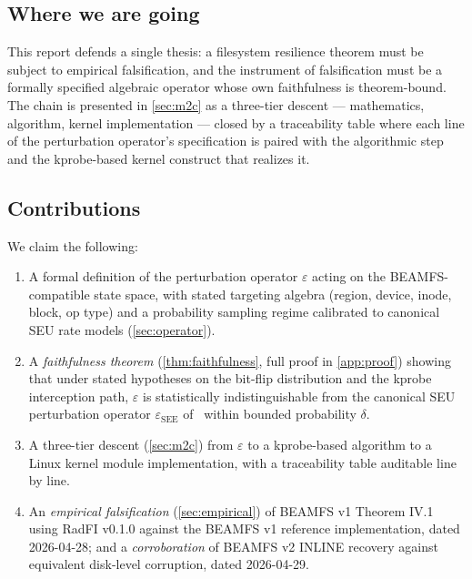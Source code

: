 \subsection{Where we are going}

This report defends a single thesis: a filesystem resilience theorem
must be subject to empirical falsification, and the instrument of
falsification must be a formally specified algebraic operator whose
own faithfulness is theorem-bound. The chain is presented in
\cref{sec:m2c} as a three-tier descent --- mathematics, algorithm,
kernel implementation --- closed by a traceability table where each
line of the perturbation operator's specification is paired with the
algorithmic step and the kprobe-based kernel construct that realizes
it.

\subsection{Contributions}

We claim the following:

\begin{enumerate}
\item A formal definition of the perturbation operator
  \(\varepsilon\) acting on the BEAMFS-compatible state space, with
  stated targeting algebra (region, device, inode, block, op type)
  and a probability sampling regime calibrated to canonical SEU
  rate models (\cref{sec:operator}).
\item A \emph{faithfulness theorem} (\cref{thm:faithfulness}, full
  proof in \cref{app:proof}) showing that under stated hypotheses on
  the bit-flip distribution and the kprobe interception path,
  \(\varepsilon\) is statistically indistinguishable from the
  canonical SEU perturbation operator \(\varepsilon_{\text{SEE}}\)
  of~\cite{desbrieres2026beamfsv1} within bounded probability
  \(\delta\).
\item A three-tier descent (\cref{sec:m2c}) from \(\varepsilon\) to a
  kprobe-based algorithm to a Linux kernel module implementation,
  with a traceability table auditable line by line.
\item An \emph{empirical falsification} (\cref{sec:empirical}) of
  BEAMFS v1 Theorem IV.1~\cite{desbrieres2026beamfsv1} using RadFI
  v0.1.0 against the BEAMFS v1 reference implementation, dated
  2026-04-28; and a \emph{corroboration} of BEAMFS v2 INLINE
  recovery against equivalent disk-level corruption, dated
  2026-04-29.
\end{enumerate}

